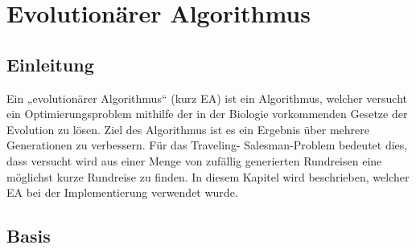 \chapter{Evolutionärer Algorithmus}
\section{Einleitung}
Ein „evolutionärer Algorithmus“ (kurz EA) ist ein Algorithmus, welcher 
versucht ein Optimierungsproblem mithilfe der in der Biologie 
vorkommenden Gesetze der Evolution zu lösen. Ziel des Algorithmus ist es
ein Ergebnis über mehrere Generationen zu verbessern. Für das Traveling-
Salesman-Problem bedeutet dies, dass versucht wird aus einer Menge
von zufällig generierten Rundreisen eine möglichst kurze Rundreise zu
finden. In diesem Kapitel wird beschrieben, welcher EA bei der
Implementierung verwendet wurde.

\section{Basis}

